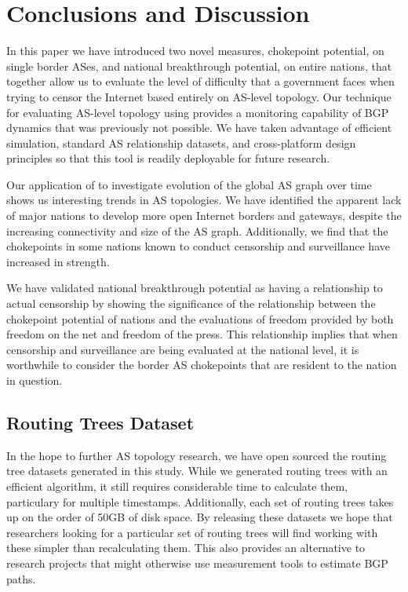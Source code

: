 \section{Conclusions and Discussion}

In this paper we have introduced two novel measures, chokepoint potential, on single border ASes,
and national breakthrough potential, on entire nations, that together allow us to
evaluate the level of difficulty that a government faces when trying to censor the Internet
based entirely on AS-level topology. Our technique for evaluating AS-level topology using
\toolname{} provides a monitoring capability of BGP dynamics that was previously not possible.
We have taken advantage of efficient simulation, standard AS relationship datasets, and cross-platform
design principles so that this tool is readily deployable for future research.
\par
Our application of \toolname{} to investigate evolution of the global AS graph over time shows us
interesting trends in AS topologies. We have identified the apparent lack of major nations to develop
more open Internet borders and gateways, despite the increasing connectivity and size of the AS graph. Additionally,
we find that the chokepoints in some nations known to conduct censorship and surveillance have increased in strength.
\par
We have validated national breakthrough potential as having a relationship to actual censorship by showing
the significance of the relationship between the chokepoint potential of nations and the evaluations of freedom provided
by both freedom on the net and freedom of the press. This relationship implies that when censorship and surveillance are being evaluated
at the national level, it is worthwhile to consider the border AS chokepoints that are resident to the nation in question.

\subsection{Routing Trees Dataset}
In the hope to further AS topology research, we have open sourced the routing tree datasets generated in this study. While we generated routing trees
with an efficient algorithm, it still requires considerable time to calculate them, particulary for multiple timestamps. Additionally, each set of routing trees
takes up on the order of 50GB of disk space. By releasing these datasets we hope that researchers looking for a particular set of routing trees will find
working with these simpler than recalculating them. This also provides an alternative to research projects that might otherwise use measurement tools to estimate
BGP paths.

